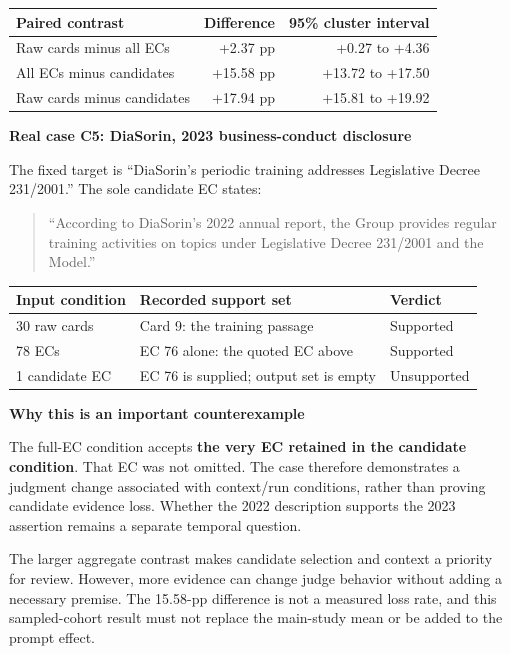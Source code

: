 \documentclass[11pt,a4paper]{article}
\newcommand{\subhead}[1]{\vspace{5pt}\textbf{#1}\par}
\newcommand{\quoted}[1]{\begin{quote}\small ``#1''\end{quote}}
\begin{document}
\begin{center}\small
\begin{tabularx}{\linewidth}{Xrr}
\toprule
Paired contrast & Difference & 95\% cluster interval\\
\midrule
Raw cards minus all ECs & +2.37 pp & +0.27 to +4.36\\
All ECs minus candidates & +15.58 pp & +13.72 to +17.50\\
Raw cards minus candidates & +17.94 pp & +15.81 to +19.92\\
\bottomrule
\end{tabularx}
\end{center}

\subhead{Real case C5: DiaSorin, 2023 business-conduct disclosure}
The fixed target is ``DiaSorin's periodic training addresses Legislative Decree 231/2001.'' The sole candidate EC states:
\quoted{According to DiaSorin's 2022 annual report, the Group provides regular training activities on topics under Legislative Decree 231/2001 and the Model.}

\begin{center}\small
\begin{tabularx}{\linewidth}{lXl}
\toprule
Input condition & Recorded support set & Verdict\\
\midrule
30 raw cards & Card 9: the training passage & Supported\\
78 ECs & EC 76 alone: the quoted EC above & Supported\\
1 candidate EC & EC 76 is supplied; output set is empty & Unsupported\\
\bottomrule
\end{tabularx}
\end{center}

\subhead{Why this is an important counterexample}
The full-EC condition accepts \textbf{the very EC retained in the candidate condition}. That EC was not omitted. The case therefore demonstrates a judgment change associated with context/run conditions, rather than proving candidate evidence loss. Whether the 2022 description supports the 2023 assertion remains a separate temporal question.

The larger aggregate contrast makes candidate selection and context a priority for review. However, more evidence can change judge behavior without adding a necessary premise. The 15.58-pp difference is not a measured loss rate, and this sampled-cohort result must not replace the main-study mean or be added to the prompt effect.
\end{document}
